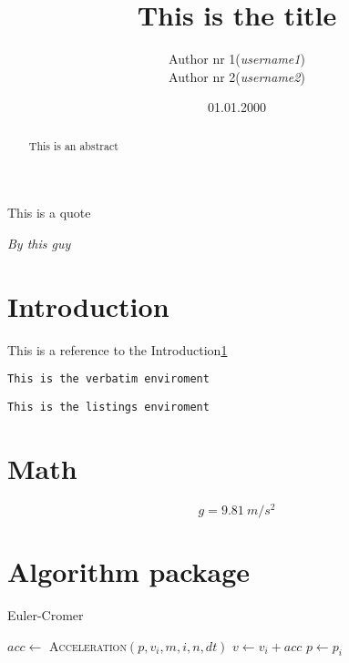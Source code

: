 \documentclass[10pt,a4paper]{article}
\begin{document}
\newcommand{\half}{\frac{1}{2}}  %
\renewcommand{\exp}{e^}


\title{This is the title}
\author{
	\begin{tabular}{rl}
		Author nr 1 & (\textit{username1})\\
		Author nr 2 & (\textit{username2})\\
	\end{tabular}}
\date{01.01.2000}
\maketitle



\setlength{\epigraphwidth}{0.75\textwidth}
\renewcommand{\epigraphflush}{center}
\renewcommand{\beforeepigraphskip}{50pt}
\renewcommand{\afterepigraphskip}{100pt}
\renewcommand{\epigraphsize}{\normalsize}
\epigraph{This is a quote}
	{\textit{By this guy}}



\begin{abstract}
\noindent
This is an abstract
\end{abstract}


\newpage
\tableofcontents    %
\newpage



\section{Introduction}\label{sec:intro}
This is a reference to the Introduction\ref{sec:intro}


\begin{verbatim}
This is the verbatim enviroment
\end{verbatim}

\begin{lstlisting}
This is the listings enviroment
\end{lstlisting}


\section*{Math}
\[
g = \SI{9.81}{m/s^2}
\]


\section*{Algorithm package}
\begin{algorithm}
\caption{Euler-Cromer} \label{alg:euler_cromer}
\begin{algorithmic}[1]
        \State $acc \gets $ \textsc{Acceleration}$(p, v_{i}, m, i, n, dt)$
        \State $v \gets v_{i} + acc$
        \State $p \gets p_{i}$
    \EndFor
  \EndProcedure
\end{algorithmic}
\end{algorithm}
\end{document}
